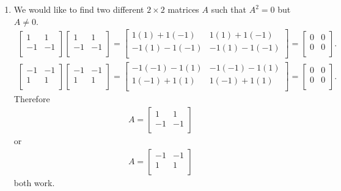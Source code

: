 \documentclass[12pt]{article}
\begin{document}
\begin{enumerate}
  \item
    We would like to find two different $2 \times 2$ matrices $A$
    such that $A^{2} = 0$ but $A \neq 0$.
    \begin{align*}
      \begin{bmatrix}
        1  & 1\\
        -1 & -1\\
      \end{bmatrix}
      \begin{bmatrix}
        1  & 1\\
        -1 & -1\\
      \end{bmatrix}
      =
      \begin{bmatrix}
        1(1) + 1(-1) & 1(1) + 1(-1)\\
        -1(1) - 1(-1) & -1(1) - 1(-1)\\
      \end{bmatrix}
      =
      \begin{bmatrix}
        0 & 0\\
        0 & 0\\
      \end{bmatrix}.
    \end{align*}
    \begin{align*}
      \begin{bmatrix}
        -1  & -1\\
        1 & 1\\
      \end{bmatrix}
      \begin{bmatrix}
        -1  & -1\\
        1 & 1\\
      \end{bmatrix}
      =
      \begin{bmatrix}
        -1(-1) - 1(1) & -1(-1) - 1(1)\\
        1(-1) + 1(1) & 1(-1) + 1(1)\\
      \end{bmatrix}
      =
      \begin{bmatrix}
        0 & 0\\
        0 & 0\\
      \end{bmatrix}.
    \end{align*}
    Therefore
    \begin{align*}
      A =
      \begin{bmatrix}
        1  & 1\\
        -1 & -1\\
      \end{bmatrix}
    \end{align*}
    or
    \begin{align*}
      A =
      \begin{bmatrix}
        -1  & -1\\
        1 & 1\\
      \end{bmatrix}
    \end{align*}
    both work.
\end{enumerate}
\end{document}
